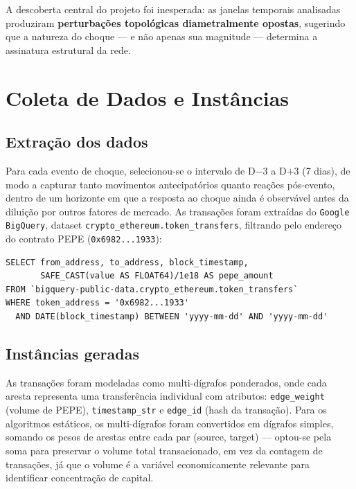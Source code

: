 \documentclass[12pt,a4paper]{article}
\begin{document}
A descoberta central do projeto foi inesperada: as janelas temporais analisadas produziram \textbf{perturbações topológicas diametralmente opostas}, sugerindo que a natureza do choque --- e não apenas sua magnitude --- determina a assinatura estrutural da rede.

\section{Coleta de Dados e Instâncias}

\subsection{Extração dos dados}

Para cada evento de choque, selecionou-se o intervalo de D$-$3 a D$+$3 (7 dias), de modo a capturar tanto movimentos antecipatórios quanto reações pós-evento, dentro de um horizonte em que a resposta ao choque ainda é observável antes da diluição por outros fatores de mercado. As transações foram extraídas do \texttt{Google BigQuery}, dataset \texttt{crypto\_ethereum.token\_transfers}, filtrando pelo endereço do contrato PEPE (\texttt{0x6982...1933}):

\begin{verbatim}
SELECT from_address, to_address, block_timestamp,
       SAFE_CAST(value AS FLOAT64)/1e18 AS pepe_amount
FROM `bigquery-public-data.crypto_ethereum.token_transfers`
WHERE token_address = '0x6982...1933'
  AND DATE(block_timestamp) BETWEEN 'yyyy-mm-dd' AND 'yyyy-mm-dd'
\end{verbatim}

\subsection{Instâncias geradas}

As transações foram modeladas como multi-dígrafos ponderados, onde cada aresta representa uma transferência individual com atributos: \texttt{edge\_weight} (volume de PEPE), \texttt{timestamp\_str} e \texttt{edge\_id} (hash da transação). Para os algoritmos estáticos, os multi-dígrafos foram convertidos em dígrafos simples, somando os pesos de arestas entre cada par (source, target) --- optou-se pela soma para preservar o volume total transacionado, em vez da contagem de transações, já que o volume é a variável economicamente relevante para identificar concentração de capital.
\end{document}

